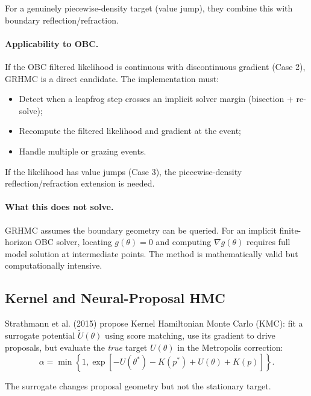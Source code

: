 For a genuinely piecewise-density target (value jump), they combine this with
boundary reflection/refraction.

\paragraph{Applicability to OBC.}
If the OBC filtered likelihood is continuous with discontinuous gradient (Case
2), GRHMC is a direct candidate. The implementation must:
\begin{itemize}
  \item Detect when a leapfrog step crosses an implicit solver margin
    (bisection + re-solve);
  \item Recompute the filtered likelihood and gradient at the event;
  \item Handle multiple or grazing events.
\end{itemize}

If the likelihood has value jumps (Case 3), the piecewise-density
reflection/refraction extension is needed.

\paragraph{What this does not solve.}
GRHMC assumes the boundary geometry can be queried. For an implicit
finite-horizon OBC solver, locating $g(\theta) = 0$ and computing $\nabla
g(\theta)$ requires full model solution at intermediate points. The method is
mathematically valid but computationally intensive.

\subsection{Kernel and Neural-Proposal HMC}

Strathmann et al. (2015) propose Kernel Hamiltonian Monte Carlo (KMC): fit a
surrogate potential $\widetilde{U}(\theta)$ using score matching, use its
gradient to drive proposals, but evaluate the \emph{true} target $U(\theta)$
in the Metropolis correction:
\begin{equation}
  \alpha = \min\left\{1, \exp\left[ -U(\theta^*) - K(p^*) + U(\theta) + K(p) \right] \right\}.
  \label{eq:kmc-correction}
\end{equation}

The surrogate changes proposal geometry but not the stationary target.

